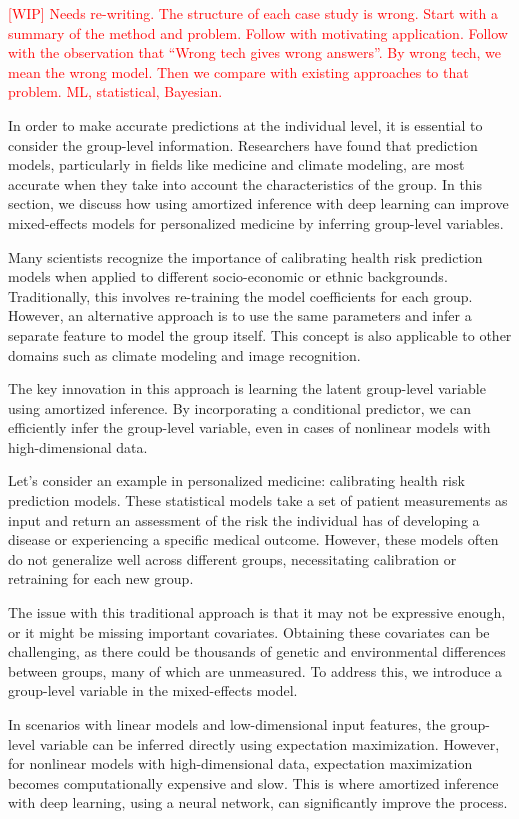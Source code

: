 \documentclass[backrefs]{cam-thesis}
\newcommand{\crit}[1]{\textcolor{red}{#1}}
\begin{document}
\crit{[WIP] Needs re-writing. The structure of each case study is wrong. Start with a summary of the method and problem. Follow with motivating application. Follow with the observation that ``Wrong tech gives wrong answers''. By wrong tech, we mean the wrong model. Then we compare with existing approaches to that problem. ML, statistical, Bayesian.}

In order to make accurate predictions at the individual level, it is essential to consider the group-level information. Researchers have found that prediction models, particularly in fields like medicine and climate modeling, are most accurate when they take into account the characteristics of the group. In this section, we discuss how using amortized inference with deep learning can improve mixed-effects models for personalized medicine by inferring group-level variables.

Many scientists recognize the importance of calibrating health risk prediction models when applied to different socio-economic or ethnic backgrounds. Traditionally, this involves re-training the model coefficients for each group. However, an alternative approach is to use the same parameters and infer a separate feature to model the group itself. This concept is also applicable to other domains such as climate modeling and image recognition.

The key innovation in this approach is learning the latent group-level variable using amortized inference. By incorporating a conditional predictor, we can efficiently infer the group-level variable, even in cases of nonlinear models with high-dimensional data.

Let's consider an example in personalized medicine: calibrating health risk prediction models. These statistical models take a set of patient measurements as input and return an assessment of the risk the individual has of developing a disease or experiencing a specific medical outcome. However, these models often do not generalize well across different groups, necessitating calibration or retraining for each new group.

The issue with this traditional approach is that it may not be expressive enough, or it might be missing important covariates. Obtaining these covariates can be challenging, as there could be thousands of genetic and environmental differences between groups, many of which are unmeasured. To address this, we introduce a group-level variable in the mixed-effects model.

In scenarios with linear models and low-dimensional input features, the group-level variable can be inferred directly using expectation maximization. However, for nonlinear models with high-dimensional data, expectation maximization becomes computationally expensive and slow. This is where amortized inference with deep learning, using a neural network, can significantly improve the process.
\end{document}
